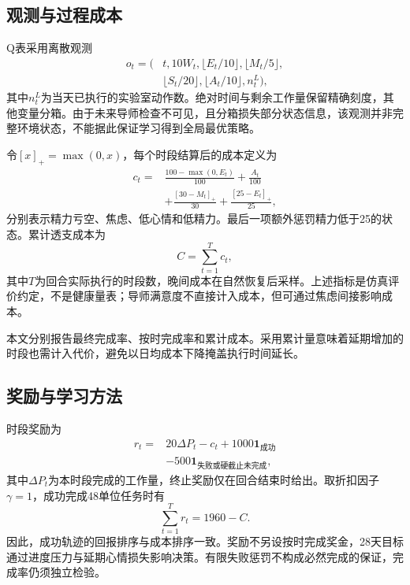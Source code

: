 \documentclass[journal]{IEEEtran}
\begin{document}
\subsection{观测与过程成本}

Q表采用离散观测
\begin{equation}
\begin{split}
o_t=\big(&t,10W_t,\lfloor E_t/10\rfloor,\lfloor M_t/5\rfloor,\\
&\lfloor S_t/20\rfloor,\lfloor A_t/10\rfloor,n_t^L\big),
\end{split}
\end{equation}
其中$n_t^L$为当天已执行的实验室动作数。绝对时间与剩余工作量保留精确刻度，其他变量分箱。由于未来导师检查不可见，且分箱损失部分状态信息，该观测并非完整环境状态，不能据此保证学习得到全局最优策略。

令$[x]_+=\max(0,x)$，每个时段结算后的成本定义为
\begin{equation}
\begin{split}
c_t={}&\frac{100-\max(0,E_t)}{100}+\frac{A_t}{100}\\
&+\frac{[30-M_t]_+}{30}+\frac{[25-E_t]_+}{25},
\end{split}
\label{eq:cost}
\end{equation}
分别表示精力亏空、焦虑、低心情和低精力。最后一项额外惩罚精力低于25的状态。累计透支成本为
\begin{equation}
C=\sum_{t=1}^{T}c_t,
\end{equation}
其中$T$为回合实际执行的时段数，晚间成本在自然恢复后采样。上述指标是仿真评价约定，不是健康量表；导师满意度不直接计入成本，但可通过焦虑间接影响成本。

本文分别报告最终完成率、按时完成率和累计成本。采用累计量意味着延期增加的时段也需计入代价，避免以日均成本下降掩盖执行时间延长。

\subsection{奖励与学习方法}

时段奖励为
\begin{equation}
\begin{split}
r_t={}&20\Delta P_t-c_t
+1000\mathbf{1}_{\mathrm{成功}}\\
&-500\mathbf{1}_{\mathrm{失败或硬截止未完成}},
\end{split}
\end{equation}
其中$\Delta P_t$为本时段完成的工作量，终止奖励仅在回合结束时给出。取折扣因子$\gamma=1$，成功完成48单位任务时有
\begin{equation}
\sum_{t=1}^{T}r_t=1960-C.
\end{equation}
因此，成功轨迹的回报排序与成本排序一致。奖励不另设按时完成奖金，28天目标通过进度压力与延期心情损失影响决策。有限失败惩罚不构成必然完成的保证，完成率仍须独立检验。
\end{document}
